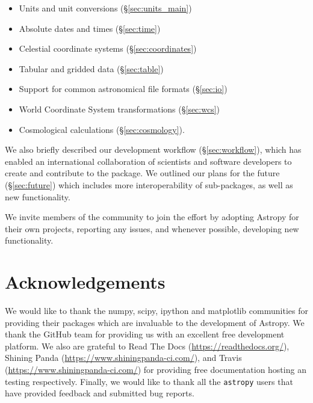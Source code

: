 \documentclass[traditabstract]{aa}
\newcommand{\astropy}{\texttt{astropy}\xspace}
\begin{document}
\begin{itemize}
\item Units and unit conversions (\S\ref{sec:units_main})
\item Absolute dates and times (\S\ref{sec:time})
\item Celestial coordinate systems (\S\ref{sec:coordinates})
\item Tabular and gridded data (\S\ref{sec:table})
\item Support for common astronomical file formats (\S\ref{sec:io})
\item World Coordinate System transformations (\S\ref{sec:wcs})
\item Cosmological calculations (\S\ref{sec:cosmology}).
\end{itemize}

We also briefly described our development workflow (\S\ref{sec:workflow}),
which has enabled an international collaboration of scientists and software
developers to create and contribute to the package. We outlined our plans for
the future (\S\ref{sec:future}) which includes more interoperability of
sub-packages, as well as new functionality.

We invite members of the community to join the effort by adopting Astropy for
their own projects, reporting any issues, and whenever possible, developing new
functionality.


\section{Acknowledgements}

\label{sec:acknowledgements}

We would like to thank the \gls{numpy}, \gls{scipy}, \gls{ipython} and
\gls{matplotlib} communities for providing their packages which are invaluable
to the development of Astropy. We thank the GitHub team for providing us with
an excellent free development platform. We also are grateful to Read The Docs
(\url{https://readthedocs.org/}), Shining Panda
(\url{https://www.shiningpanda-ci.com/}), and Travis
(\url{https://www.shiningpanda-ci.com/}) for providing free documentation
hosting an testing respectively. Finally, we would like to thank all the
\astropy users that have provided feedback and submitted bug reports.



\end{document}
